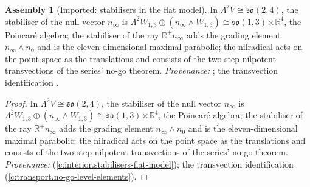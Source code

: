 \documentclass[11pt]{article}
\theoremstyle{definition}
\newtheorem{assembled}[theorem]{Assembly}
\theoremstyle{plain}
\providecommand{\R}{}\renewcommand{\R}{\mathbb{R}}
\providecommand{\nInf}{}\renewcommand{\nInf}{n_\infty}
\providecommand{\nO}{}\renewcommand{\nO}{n_0}
\begin{document}
\begin{assembled}[Imported: stabilisers in the flat model]\label{c:correspondence.imported-stabilisers-flat-model}
In $\Lambda^2 V \cong \mathfrak{so}(2,4)$, the stabiliser of the null vector $\nInf$ is $\Lambda^2 W_{1,3} \oplus (\nInf\wedge W_{1,3}) \cong \mathfrak{so}(1,3)\ltimes\R^4$, the Poincar\'e algebra; the stabiliser of the ray $\R^+\nInf$ adds the grading element $\nInf\wedge\nO$ and is the eleven-dimensional maximal parabolic; the nilradical acts on the point space as the translations and consists of the two-step nilpotent transvections of the series' no-go theorem. \emph{Provenance:} \cite[Prop.~4.3]{ButlerT6}; the transvection identification \cite[Thm.~4.2]{ButlerT1}.
\end{assembled}
\begin{proof}
In $\Lambda^2 V \cong \mathfrak{so}(2,4)$, the stabiliser of the null vector $\nInf$ is $\Lambda^2 W_{1,3} \oplus (\nInf\wedge W_{1,3}) \cong \mathfrak{so}(1,3)\ltimes\R^4$, the Poincar\'e algebra; the stabiliser of the ray $\R^+\nInf$ adds the grading element $\nInf\wedge\nO$ and is the eleven-dimensional maximal parabolic; the nilradical acts on the point space as the translations and consists of the two-step nilpotent transvections of the series' no-go theorem. \emph{Provenance:} \cite[Prop.~4.3]{ButlerT6} (\ref{c:interior.stabilisers-flat-model}); the transvection identification \cite[Thm.~4.2]{ButlerT1} (\ref{c:transport.no-go-level-elements}).

\end{proof}
\end{document}
